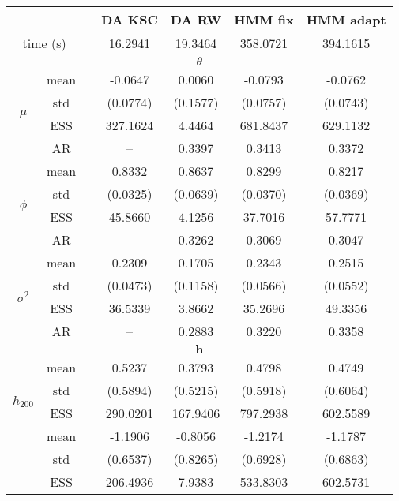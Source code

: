 { \renewcommand{\arraystretch}{1.2} 
\begin{table} 
\center 
\begin{tabular}{ccc cc cc} 
\hline 
 & && DA KSC & DA RW & HMM fix & HMM adapt \\ \hline  \hline
 \multicolumn{2}{c}{time (s)}& & 16.2941  & 19.3464  & 358.0721  & 394.1615  \\  \hline 
\multicolumn{7}{c}{$\theta$} \\ \hline 
\multirow{4}{*}{$\mu$}   & mean  &   & -0.0647  & 0.0060  & -0.0793  & -0.0762  \\ [0.75ex]
 & std  &   & (0.0774)  & (0.1577)  & (0.0757)  & (0.0743)  \\ [0.75ex]
 & ESS  &   & 327.1624  & 4.4464  & 681.8437  & 629.1132  \\ [0.75ex]
 & AR && --  & 0.3397  & 0.3413  & 0.3372  \\ [1.3ex] 
\multirow{4}{*}{$\phi$}   & mean  &   & 0.8332  & 0.8637  & 0.8299  & 0.8217  \\ [0.75ex]
 & std  &   & (0.0325)  & (0.0639)  & (0.0370)  & (0.0369)  \\ [0.75ex]
 & ESS  &   & 45.8660  & 4.1256  & 37.7016  & 57.7771  \\ [0.75ex]
 & AR && --  & 0.3262  & 0.3069  & 0.3047  \\ [1.3ex] 
\multirow{4}{*}{$\sigma^2$}   & mean  &   & 0.2309  & 0.1705  & 0.2343  & 0.2515  \\ [0.75ex]
 & std  &   & (0.0473)  & (0.1158)  & (0.0566)  & (0.0552)  \\ [0.75ex]
 & ESS  &   & 36.5339  & 3.8662  & 35.2696  & 49.3356  \\ [0.75ex]
 & AR && --  & 0.2883  & 0.3220  & 0.3358  \\ [1.3ex] 
\hline 
\multicolumn{7}{c}{$ \bm{h} $} \\ \hline 
\multirow{4}{*}{$h_{200}$}   & mean &   & 0.5237  & 0.3793  & 0.4798  & 0.4749  \\ [0.75ex]
 & std &   & (0.5894)  & (0.5215)  & (0.5918)  & (0.6064)  \\ [0.75ex]
 & ESS  &   & 290.0201  & 167.9406  & 797.2938  & 602.5589  \\ [1.3ex] 
\multirow{4}{*}{$h_{600}$}   & mean &   & -1.1906  & -0.8056  & -1.2174  & -1.1787  \\ [0.75ex]
 & std &   & (0.6537)  & (0.8265)  & (0.6928)  & (0.6863)  \\ [0.75ex]
 & ESS  &   & 206.4936  & 7.9383  & 533.8303  & 602.5731  \\ [1.3ex] 

\end{tabular}
\end{table}}
